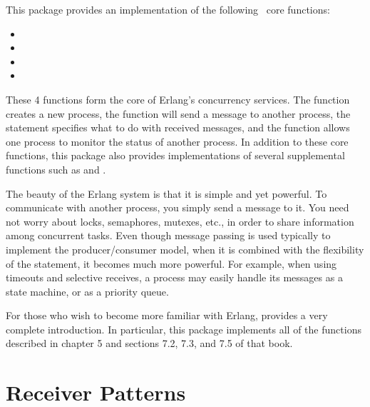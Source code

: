 \documentclass{howto}
\newcommand{\Erlang}{\ulink{Erlang}{http://www.erlang.org/}}
\begin{document}
This package provides an implementation of the following \Erlang\ core
functions:
\begin{itemize}
	\item {}
	\item {}
	\item {}
	\item {}
\end{itemize}

These 4 functions form the core of Erlang's concurrency services. The
 function creates a new process, the 
function will send a message to another process, the  statement
specifies what to do with received messages, and the  function
allows one process to monitor the status of another process. In addition to
these core functions, this package also provides implementations of several
supplemental functions such as  and .

The beauty of the Erlang system is that it is simple and yet powerful.
To communicate with another process, you simply send a message to it.
You need not worry about locks, semaphores, mutexes, etc., in order to
share information among concurrent tasks. Even though message passing is
used typically to implement the producer/consumer model, when it is combined
with the flexibility of the  statement, it becomes much more
powerful. For example, when using timeouts and selective receives, a process
may easily handle its messages as a state machine, or as a priority queue.

For those who wish to become more familiar with Erlang,
 provides a very complete introduction. In
particular, this package implements all of the functions described in chapter 5
and sections 7.2, 7.3, and 7.5 of that book.



\section{Receiver Patterns}

\newcommand{\addhandler}{\method{addHandler()}}
\end{document}
